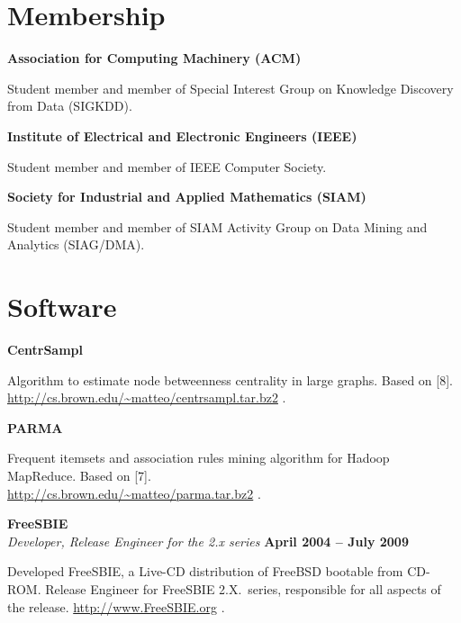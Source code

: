 \documentclass[margin,line]{resume}
\begin{document}
\section{\sc Membership}
{\bf Association for Computing Machinery (ACM)}
\begin{list2}
\vspace*{.05in}
\item Student member and member of Special Interest Group on Knowledge Discovery
  from Data (SIGKDD).
\end{list2}
{\bf Institute of Electrical and Electronic Engineers (IEEE)}
\begin{list2}
\vspace*{.05in}
\item Student member and member of IEEE Computer Society.
\end{list2}
{\bf Society for Industrial and Applied Mathematics (SIAM)}
\begin{list2}
\vspace*{.05in}
\item Student member and member of SIAM Activity Group on Data Mining and Analytics
  (SIAG/DMA).
\end{list2}

\pagebreak
\section{\sc Software}

{\bf CentrSampl}
\begin{list2}
  \vspace*{.05in}
\item Algorithm to estimate node betweenness centrality in large graphs. Based
  on [8]. \\\url{http://cs.brown.edu/~matteo/centrsampl.tar.bz2} .
\end{list2}

{\bf PARMA} 
\begin{list2}
  \vspace*{.05in}
\item Frequent itemsets and association rules mining algorithm for Hadoop MapReduce.
  Based on [7]. \\\url{http://cs.brown.edu/~matteo/parma.tar.bz2} .
\end{list2}

{\bf FreeSBIE }\\
{\em Developer, Release Engineer for the 2.x series} \hfill{\bf April 2004 --
July 2009}

\begin{list2}
\vspace*{.05in}
\item Developed FreeSBIE, a Live-CD distribution of FreeBSD bootable from CD-ROM.
Release Engineer for FreeSBIE 2.X.~series, responsible for all aspects of
the release. \url{http://www.FreeSBIE.org} .
\end{list2}
\end{document}
